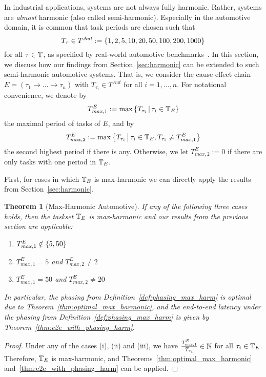 \documentclass[10pt,conference]{resources/IEEEtran}
\newtheorem{theorem}{Theorem}%
\theoremstyle{definition}
\newcommand{\Tmaxone}{T^E_{\mathit{max},1}}
\newcommand{\Tmaxtwo}{T^E_{\mathit{max},2}}
\begin{document}
	In industrial applications, systems are not always fully harmonic. 
	Rather, systems are \emph{almost} harmonic (also called semi-harmonic).
	Especially in the automotive domain, it is common that task periods are chosen such that 
	\begin{equation}
		T_\tau \in T^{\mathit{Aut}} := \left\{{1,2,5,10,20,50,100,200,1000}\right\} 
	\end{equation} 
	for all $\tau \in \mathbb{T}$,
	as specified by real-world automotive benchmarks~\cite{kramer2015real}.
	In this section, we discuss how our findings from Section~\ref{sec:harmonic} can be extended to such semi-harmonic automotive systems.
	That is, we consider the cause-effect chain $E = (\tau_1 \to\dots\to \tau_n)$ with $T_{\tau_i} \in T^{\mathit{Aut}}$ for all $i=1, \dots, n$.
	For notational convenience, we denote by 
	\begin{equation}
		\Tmaxone := \max \set{T_{\tau_i}}{\tau_i\in \Tbb_E}
	\end{equation}
	the maximal period of tasks of $E$, and by 
	\begin{equation}
		\Tmaxtwo := \max \set{T_{\tau_i}}{\tau_i\in \Tbb_E, T_{\tau_i} \neq \Tmaxone}
	\end{equation}
	the second highest period if there is any.
	Otherwise, we let $\Tmaxtwo := 0$ if there are only tasks with one period in $\mathbb{T}_E$.

	First, for cases in which $\mathbb{T}_E$ is max-harmonic we can directly apply the results from Section~\ref{sec:harmonic}.

	\begin{theorem}[Max-Harmonic Automotive]
		If any of the following three cases holds, then the taskset $\mathbb{T}_E$ is max-harmonic and our results from the previous section are applicable:
		\begin{enumerate}[label=(\roman*)]
			\item $\Tmaxone \notin \setof{5,50}$
			\item $\Tmaxone = 5$ and $\Tmaxtwo \neq 2$
			\item $\Tmaxone = 50$ and $\Tmaxtwo \neq 20$
		\end{enumerate}
		In particular, the phasing from Definition~\ref{def:phasing_max_harm} is optimal due to Theorem~\ref{thm:optimal_max_harmonic}, and the end-to-end latency under the phasing from Definition~\ref{def:phasing_max_harm} is given by Theorem~\ref{thm:e2e_with_phasing_harm}.
	\end{theorem}

	\begin{proof}
		Under any of the cases (i), (ii) and (iii), we have
		$\frac{\Tmaxone}{T_{\tau_i}} \in \Nbb$ for all $\tau_i \in \mathbb{T}_E$.
		Therefore, $\mathbb{T}_E$ is max-harmonic, and Theorems~\ref{thm:optimal_max_harmonic} and~\ref{thm:e2e_with_phasing_harm} can be applied.
	\end{proof}
\end{document}
